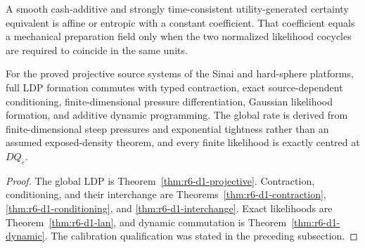A smooth cash-additive and strongly time-consistent utility-generated certainty
equivalent is affine or entropic with a constant coefficient.  That coefficient
equals a mechanical preparation field only when the two normalized likelihood
cocycles are required to coincide in the same units.

\begin{theorem}
\label{thm:r6-d1-main}
For the proved projective source systems of the Sinai and hard-sphere
platforms, full LDP formation commutes with typed contraction, exact
source-dependent conditioning, finite-dimensional pressure differentiation,
Gaussian likelihood formation, and additive dynamic programming.  The global
rate is derived from finite-dimensional steep pressures and exponential
tightness rather than an assumed exposed-density theorem, and every finite
likelihood is exactly centred at \(DQ_\varepsilon\).
\end{theorem}

\begin{proof}
The global LDP is Theorem~\ref{thm:r6-d1-projective}.  Contraction,
conditioning, and their interchange are
Theorems~\ref{thm:r6-d1-contraction},
\ref{thm:r6-d1-conditioning}, and
\ref{thm:r6-d1-interchange}.  Exact likelihoods are
Theorem~\ref{thm:r6-d1-lan}, and dynamic commutation is
Theorem~\ref{thm:r6-d1-dynamic}.  The calibration qualification was stated in
the preceding subsection.
\end{proof}
